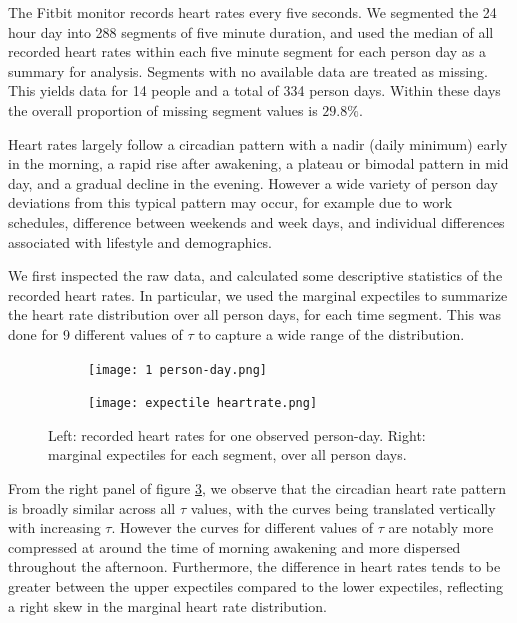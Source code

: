 \documentclass{article}
\begin{document}
The Fitbit monitor records heart rates every five seconds.  We segmented the 24 hour day into 288 segments of five minute duration, and used the median of all recorded heart rates within each five minute segment for each person day as a summary for analysis.  Segments with no available data are treated as missing.  This yields data for 14 people and a total of 334 person days.  Within these days the overall proportion of missing segment values is $29.8\%$.

Heart rates largely follow a circadian pattern with a nadir (daily minimum) early in the morning, a rapid rise after awakening, a plateau or bimodal pattern in mid day, and a gradual decline in the evening.  However a wide variety of person day deviations from this typical pattern may occur, for example due to work schedules, difference between weekends and week days, and individual differences associated with lifestyle and demographics.

We first inspected the raw data, and calculated some descriptive statistics of the recorded heart rates.  In particular, we used the marginal expectiles to summarize the heart rate distribution over all person days, for each time segment.  This was done for 9 different values of $\tau$ to capture a wide range of the distribution.

\begin{figure}[ht]
  \centering
  \begin{subfigure}[b]{0.48\textwidth}
    \texttt{[image: 1 person-day.png]}
    \label{fig:sub1}
  \end{subfigure}
  \hfill
  \begin{subfigure}[b]{0.49\textwidth}
    \texttt{[image: expectile heartrate.png]}
    \label{fig:sub2}
  \end{subfigure}
  \caption{Left: recorded heart rates for one observed person-day.  Right: marginal expectiles for each segment, over all person days.}
  \label{fig:example}
\end{figure}

From the right panel of figure \ref{fig:example}, we observe that
the circadian heart rate pattern is broadly similar across all $\tau$ values, with the curves being translated vertically with increasing $\tau$.  However the curves for different values of $\tau$ are notably more compressed at around the time of morning awakening and more dispersed throughout the afternoon.  Furthermore, the difference in heart rates tends to be greater between the upper expectiles compared to the lower expectiles, reflecting a right skew in the marginal heart rate distribution.
\end{document}

